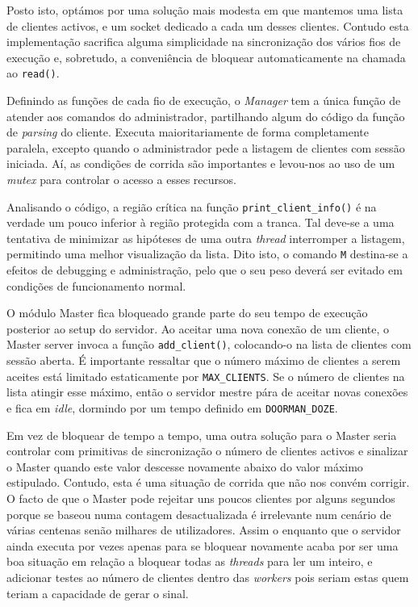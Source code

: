	Posto isto, optámos por uma solução mais modesta em que mantemos uma lista de clientes activos, e um socket dedicado a cada um desses clientes.
	Contudo esta implementação sacrifica alguma simplicidade na sincronização dos vários fios de execução e, sobretudo, a conveniência de bloquear automaticamente na chamada ao \verb|read()|.

	\setlength{\parskip}{20pt}		%

	Definindo as funções de cada fio de execução, o \emph{Manager} tem a única função de atender aos comandos do administrador, partilhando algum do código da função de \emph{parsing} do cliente.
	Executa maioritariamente de forma completamente paralela, excepto quando o administrador pede a listagem de clientes com sessão iniciada.
	Aí, as condições de corrida são importantes e levou-nos ao uso de um \emph{mutex} para controlar o acesso a esses recursos.

	\setlength{\parskip}{5pt}		%

	Analisando o código, a região crítica na função \verb|print_client_info()| é na verdade um pouco inferior à região protegida com a tranca.
	Tal deve-se a uma tentativa de minimizar as hipóteses de uma outra \emph{thread} interromper a listagem, permitindo uma melhor visualização da lista.
	Dito isto, o comando \verb|M| destina-se a efeitos de debugging e administração, pelo que o seu peso deverá ser evitado em condições de funcionamento normal.

	\setlength{\parskip}{20pt}		%

	O módulo Master fica bloqueado grande parte do seu tempo de execução posterior ao setup do servidor.
	Ao aceitar uma nova conexão de um cliente, o Master server invoca a função \verb|add_client()|, colocando-o na lista de clientes com sessão aberta.
	É importante ressaltar que o número máximo de clientes a serem aceites está limitado estaticamente por \verb|MAX_CLIENTS|.
	Se o número de clientes na lista atingir esse máximo, então o servidor mestre pára de aceitar novas conexões e fica em \emph{idle}, dormindo por um tempo definido em \verb|DOORMAN_DOZE|.

	\setlength{\parskip}{5pt}		%

	Em vez de bloquear de tempo a tempo, uma outra solução para o Master seria controlar com primitivas de sincronização o número de clientes activos e sinalizar o Master quando este valor descesse novamente abaixo do valor máximo estipulado.
	Contudo, esta é uma situação de corrida que não nos convém corrigir.
	O facto de que o Master pode rejeitar uns poucos clientes por alguns segundos porque se baseou numa contagem desactualizada é irrelevante num cenário de várias centenas senão milhares de utilizadores.
	Assim o enquanto que o servidor ainda executa por vezes apenas para se bloquear novamente acaba por ser uma boa situação em relação a bloquear todas as \emph{threads} para ler um inteiro, e adicionar testes ao número de clientes dentro das \emph{workers} pois seriam estas quem teriam a capacidade de gerar o sinal.


